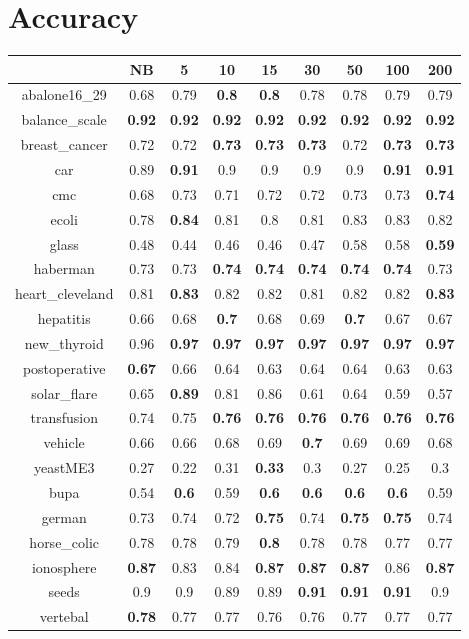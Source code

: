 \documentclass{article}%
\begin{document}
%
\normalsize%
\section*{Accuracy}%
\begin{tabular}{c|cccccccc}%
\hline%
&NB&5&10&15&30&50&100&200\\%
\hline%
abalone16\_29&0.68&0.79&\textbf{0.8}&\textbf{0.8}&0.78&0.78&0.79&0.79\\%
\hline%
balance\_scale&\textbf{0.92}&\textbf{0.92}&\textbf{0.92}&\textbf{0.92}&\textbf{0.92}&\textbf{0.92}&\textbf{0.92}&\textbf{0.92}\\%
\hline%
breast\_cancer&0.72&0.72&\textbf{0.73}&\textbf{0.73}&\textbf{0.73}&0.72&\textbf{0.73}&\textbf{0.73}\\%
\hline%
car&0.89&\textbf{0.91}&0.9&0.9&0.9&0.9&\textbf{0.91}&\textbf{0.91}\\%
\hline%
cmc&0.68&0.73&0.71&0.72&0.72&0.73&0.73&\textbf{0.74}\\%
\hline%
ecoli&0.78&\textbf{0.84}&0.81&0.8&0.81&0.83&0.83&0.82\\%
\hline%
glass&0.48&0.44&0.46&0.46&0.47&0.58&0.58&\textbf{0.59}\\%
\hline%
haberman&0.73&0.73&\textbf{0.74}&\textbf{0.74}&\textbf{0.74}&\textbf{0.74}&\textbf{0.74}&0.73\\%
\hline%
heart\_cleveland&0.81&\textbf{0.83}&0.82&0.82&0.81&0.82&0.82&\textbf{0.83}\\%
\hline%
hepatitis&0.66&0.68&\textbf{0.7}&0.68&0.69&\textbf{0.7}&0.67&0.67\\%
\hline%
new\_thyroid&0.96&\textbf{0.97}&\textbf{0.97}&\textbf{0.97}&\textbf{0.97}&\textbf{0.97}&\textbf{0.97}&\textbf{0.97}\\%
\hline%
postoperative&\textbf{0.67}&0.66&0.64&0.63&0.64&0.64&0.63&0.63\\%
\hline%
solar\_flare&0.65&\textbf{0.89}&0.81&0.86&0.61&0.64&0.59&0.57\\%
\hline%
transfusion&0.74&0.75&\textbf{0.76}&\textbf{0.76}&\textbf{0.76}&\textbf{0.76}&\textbf{0.76}&\textbf{0.76}\\%
\hline%
vehicle&0.66&0.66&0.68&0.69&\textbf{0.7}&0.69&0.69&0.68\\%
\hline%
yeastME3&0.27&0.22&0.31&\textbf{0.33}&0.3&0.27&0.25&0.3\\%
\hline%
bupa&0.54&\textbf{0.6}&0.59&\textbf{0.6}&\textbf{0.6}&\textbf{0.6}&\textbf{0.6}&0.59\\%
\hline%
german&0.73&0.74&0.72&\textbf{0.75}&0.74&\textbf{0.75}&\textbf{0.75}&0.74\\%
\hline%
horse\_colic&0.78&0.78&0.79&\textbf{0.8}&0.78&0.78&0.77&0.77\\%
\hline%
ionosphere&\textbf{0.87}&0.83&0.84&\textbf{0.87}&\textbf{0.87}&\textbf{0.87}&0.86&\textbf{0.87}\\%
\hline%
seeds&0.9&0.9&0.89&0.89&\textbf{0.91}&\textbf{0.91}&\textbf{0.91}&0.9\\%
\hline%
vertebal&\textbf{0.78}&0.77&0.77&0.76&0.76&0.77&0.77&0.77\\%
\hline%
\end{tabular}
\end{document}
